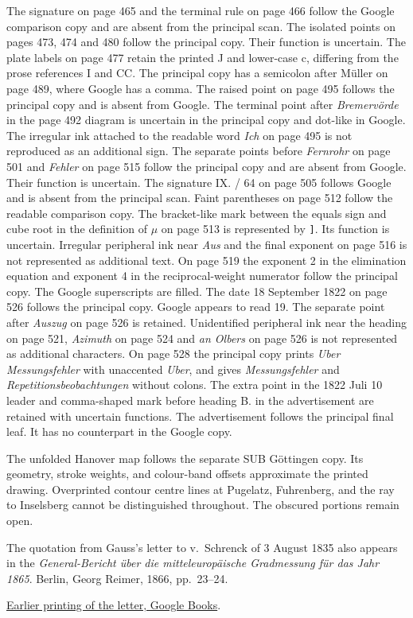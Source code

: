The signature on page 465 and the terminal rule on page 466 follow the
Google comparison copy and are absent from the principal scan.
The isolated points on pages 473, 474 and 480 follow the principal copy. Their function is uncertain. The plate labels on page 477 retain the
printed J and lower-case c, differing from the prose references I and CC.
The principal copy has a semicolon after Müller on page 489, where Google has a comma. The raised point on page 495 follows the principal copy and is absent from Google.
The terminal point after \textit{Bremervörde} in the page 492 diagram is uncertain
in the principal copy and dot-like in Google. The irregular ink attached
to the readable word \textit{Ich} on page 495 is not reproduced as an additional sign.
The separate points before \textit{Fernrohr} on page 501 and \textit{Fehler} on page 515
follow the principal copy and are absent from Google. Their function is uncertain.
The signature IX. / 64 on page 505 follows Google and is absent from the
principal scan. Faint parentheses on page 512 follow the readable comparison
copy. The bracket-like mark between the equals sign and cube root in the
definition of \(\mu\) on page 513 is represented by \texttt{]}. Its function is uncertain.
Irregular peripheral ink near \textit{Aus} and the final exponent on page 516 is
not represented as additional text.
On page 519 the exponent 2 in the elimination equation and exponent 4
in the reciprocal-weight numerator follow the principal copy. The Google superscripts are filled. The date 18 September 1822 on page 526 follows
the principal copy. Google appears to read 19. The separate point after
\textit{Auszug} on page 526 is retained. Unidentified peripheral ink near the
heading on page 521, \textit{Azimuth} on page 524 and \textit{an Olbers} on page 526 is
not represented as additional characters. On page 528 the principal copy prints \textit{Uber Messungsfehler} with unaccented \textit{Uber}, and gives \textit{Messungsfehler} and \textit{Repetitionsbeobachtungen} without colons. The extra point in
the 1822 Juli 10 leader and comma-shaped mark before heading B. in the
advertisement are retained with uncertain functions. The advertisement follows the principal final leaf. It has no counterpart in the Google copy.

The unfolded Hanover map follows the separate SUB Göttingen copy. Its geometry, stroke weights, and colour-band offsets approximate the printed drawing. Overprinted contour centre lines at Pugelatz, Fuhrenberg, and the ray to Inselsberg cannot be distinguished throughout. The obscured portions remain open.

The quotation from Gauss's letter to v.~Schrenck of 3 August 1835 also appears in the \textit{General-Bericht über die mitteleuropäische Gradmessung für das Jahr 1865}. Berlin, Georg Reimer, 1866, pp.~23--24.\par
\noindent\href{https://books.google.com/books?id=VBNDAAAAcAAJ\&pg=PA24}{Earlier printing of the letter, Google Books}.


